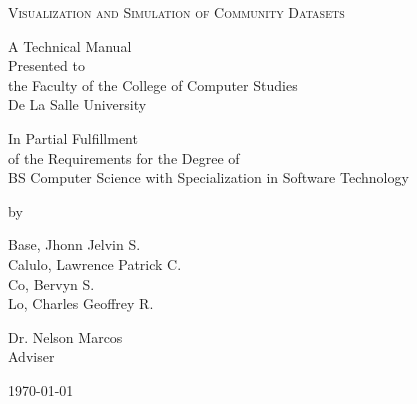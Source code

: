 \begin{titlepage}
\begin{center}

{\Large
    \textsc{Visualization and Simulation of Community Datasets}
\par}


\bigskip
A Technical Manual\\
Presented to\\
the Faculty of the College of Computer Studies\\
De La Salle University

\bigskip
In Partial Fulfillment\\
of the Requirements for the Degree of\\
BS Computer Science with Specialization in Software Technology

\bigskip
by

Base, Jhonn Jelvin S.\\
Calulo, Lawrence Patrick C.\\
Co, Bervyn S.\\
Lo, Charles Geoffrey R.

\bigskip
Dr. Nelson Marcos\\
Adviser

\bigskip
\today

\bigskip
\date{today}
\end{center}
\end{titlepage}
